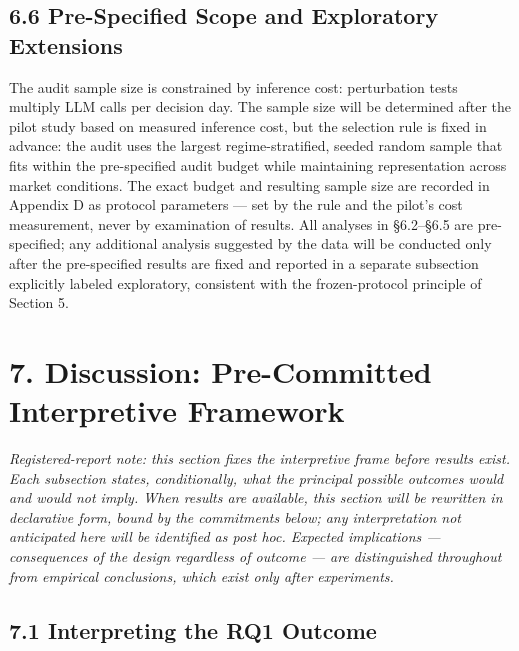 \documentclass[
  12pt,
]{article}
\begin{document}
\hypertarget{pre-specified-scope-and-exploratory-extensions}{%
\subsection{6.6 Pre-Specified Scope and Exploratory
Extensions}\label{pre-specified-scope-and-exploratory-extensions}}

The audit sample size is constrained by inference cost: perturbation
tests multiply LLM calls per decision day. The sample size will be
determined after the pilot study based on measured inference cost, but
the selection rule is fixed in advance: the audit uses the largest
regime-stratified, seeded random sample that fits within the
pre-specified audit budget while maintaining representation across
market conditions. The exact budget and resulting sample size are
recorded in Appendix D as protocol parameters --- set by the rule and
the pilot's cost measurement, never by examination of results. All
analyses in §6.2--§6.5 are pre-specified; any additional analysis
suggested by the data will be conducted only after the pre-specified
results are fixed and reported in a separate subsection explicitly
labeled exploratory, consistent with the frozen-protocol principle of
Section 5.

\hypertarget{discussion-pre-committed-interpretive-framework}{%
\section{7. Discussion: Pre-Committed Interpretive
Framework}\label{discussion-pre-committed-interpretive-framework}}

\emph{Registered-report note: this section fixes the interpretive frame
before results exist. Each subsection states, conditionally, what the
principal possible outcomes would and would not imply. When results are
available, this section will be rewritten in declarative form, bound by
the commitments below; any interpretation not anticipated here will be
identified as post hoc. Expected implications --- consequences of the
design regardless of outcome --- are distinguished throughout from
empirical conclusions, which exist only after experiments.}

\hypertarget{interpreting-the-rq1-outcome}{%
\subsection{7.1 Interpreting the RQ1
Outcome}\label{interpreting-the-rq1-outcome}}
\end{document}
